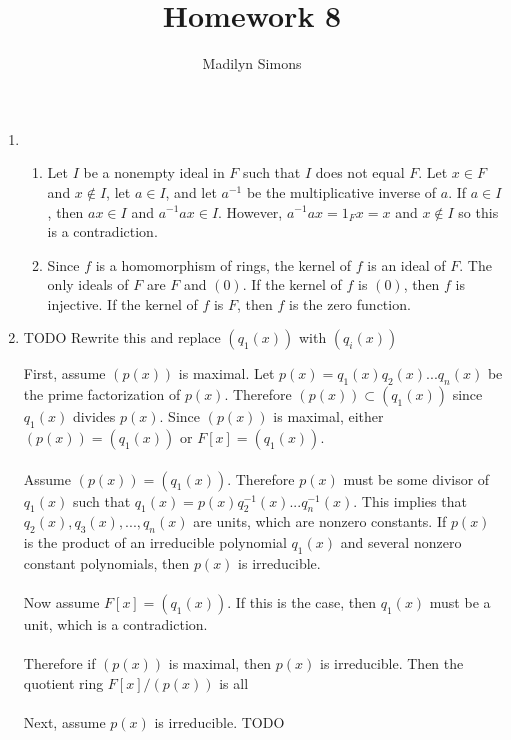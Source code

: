 \documentclass{article}
\title{Homework 8}
\author{Madilyn Simons}
\date{}
\begin{document}
\maketitle

\begin{enumerate}

\item
\begin{enumerate}

\item Let $I$ be a nonempty ideal in $F$ such that $I$ does not equal $F$.
Let $x \in F$ and $x \notin I$, let $a \in I$, and let $a^{-1}$ be the
multiplicative inverse of $a$.  If $a \in I$, then $ax \in I$ and
$a^{-1}ax \in I$.  However, $a^{-1}ax = 1_{F}x = x$ and $x \notin I$ so this
is a contradiction.

\item Since $f$ is a homomorphism of rings, the kernel of $f$ is an ideal
of $F$.  The only ideals of $F$ are $F$ and $(0)$.  If the kernel of
$f$ is $(0)$, then $f$ is injective.  If the kernel of $f$ is $F$, then
$f$ is the zero function.

\end{enumerate}

\item TODO Rewrite this and replace $(q_{1}(x))$ with $(q_{i}(x))$

First, assume $(p(x))$ is maximal.  Let
$p(x) = q_{1}(x)q_{2}(x) ... q_{n}(x)$ be the prime factorization of $p(x)$.
Therefore $(p(x)) \subset (q_{1}(x))$ since $q_{1}(x)$ divides $p(x)$.
Since $(p(x))$ is maximal, either $(p(x)) = (q_{1}(x))$ or $F[x] = (q_{1}(x))$.
\\ \\
Assume $(p(x)) = (q_{1}(x))$.  Therefore $p(x)$ must be some divisor of
$q_{1}(x)$ such that $q_{1}(x) = p(x)q_{2}^{-1}(x) ... q_{n}^{-1}(x)$.  This
implies that $q_{2}(x), q_{3}(x), ..., q_{n}(x)$ are units, which are nonzero
constants.  If $p(x)$ is the product of an irreducible polynomial $q_{1}(x)$
and several nonzero constant polynomials, then $p(x)$ is irreducible.
\\ \\
Now assume $F[x] = (q_{1}(x))$.  If this is the case, then $q_{1}(x)$ must
be a unit, which is a contradiction.
\\ \\
Therefore if $(p(x))$ is maximal, then $p(x)$ is irreducible.  Then the quotient
ring $F[x]/(p(x))$ is all
\\ \\
Next, assume $p(x)$ is irreducible.  TODO


\end{enumerate}
\end{document}
